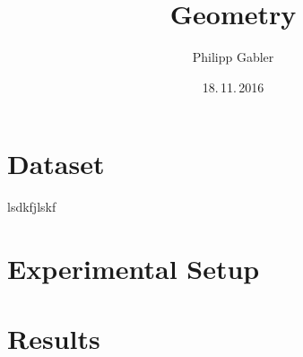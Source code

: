 \documentclass{beamer}
\author{Philipp Gabler}
\title{Geometry}
\date{18.\,11.\,2016}
\begin{document}
\section{Dataset}
\begin{frame}
lsdkfjlskf
\end{frame}


\section{Experimental Setup}
\begin{frame}  %
\end{frame}



\section{Results}
\begin{frame}
\end{frame}
\end{document}
